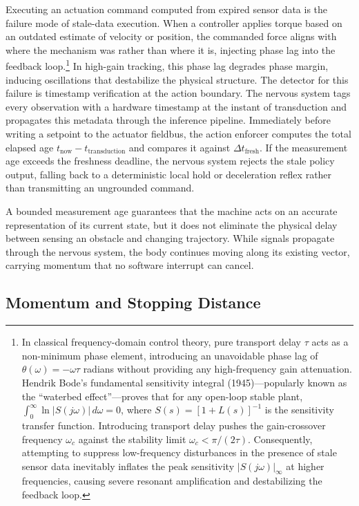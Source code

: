 \documentclass[
  letterpaper,
  DIV=11,
  numbers=noendperiod]{scrartcl}
\begin{document}
Executing an actuation command computed from expired sensor data is the
failure mode of stale-data execution. When a controller applies torque
based on an outdated estimate of velocity or position, the commanded
force aligns with where the mechanism was rather than where it is,
injecting phase lag into the feedback loop.\footnote{In classical
  frequency-domain control theory, pure transport delay \(\tau\) acts as
  a non-minimum phase element, introducing an unavoidable phase lag of
  \(\theta(\omega) = -\omega \tau\) radians without providing any
  high-frequency gain attenuation. Hendrik Bode's fundamental
  sensitivity integral (1945)---popularly known as the ``waterbed
  effect''---proves that for any open-loop stable plant,
  \(\int_0^\infty \ln |S(j\omega)| \, d\omega = 0\), where
  \(S(s) = [1 + L(s)]^{-1}\) is the sensitivity transfer function.
  Introducing transport delay pushes the gain-crossover frequency
  \(\omega_c\) against the stability limit
  \(\omega_c < \pi / (2 \tau)\). Consequently, attempting to suppress
  low-frequency disturbances in the presence of stale sensor data
  inevitably inflates the peak sensitivity \(|S(j\omega)|_{\infty}\) at
  higher frequencies, causing severe resonant amplification and
  destabilizing the feedback loop.} In high-gain tracking, this phase
lag degrades phase margin, inducing oscillations that destabilize the
physical structure. The detector for this failure is timestamp
verification at the action boundary. The nervous system tags every
observation with a hardware timestamp at the instant of transduction and
propagates this metadata through the inference pipeline. Immediately
before writing a setpoint to the actuator fieldbus, the action enforcer
computes the total elapsed age
\(t_{\text{now}} - t_{\text{transduction}}\) and compares it against
\(\Delta t_{\text{fresh}}\). If the measurement age exceeds the
freshness deadline, the nervous system rejects the stale policy output,
falling back to a deterministic local hold or deceleration reflex rather
than transmitting an ungrounded command.

A bounded measurement age guarantees that the machine acts on an
accurate representation of its current state, but it does not eliminate
the physical delay between sensing an obstacle and changing trajectory.
While signals propagate through the nervous system, the body continues
moving along its existing vector, carrying momentum that no software
interrupt can cancel.

\subsection{Momentum and Stopping Distance}\label{sec-body-2-3}
\end{document}
